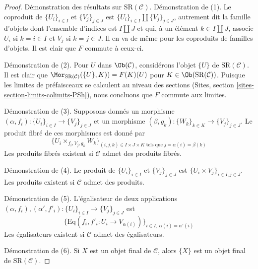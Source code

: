\begin{proof}
Démonstration des résultats sur $\text{SR}(\mathcal{C})$.
Démonstration de (1). Le coproduit de $\{U_i\}_{i \in I}$ et $\{V_j\}_{j \in J}$ est
$\{U_i\}_{i \in I} \amalg \{V_j\}_{j \in J}$, autrement dit la famille
d'objets dont l'ensemble d'indices est $I \amalg J$ et qui, à un élément
$k \in I \amalg J$, associe $U_i$ si $k = i \in I$ et $V_j$ si
$k = j \in J$. Il en va de même pour les coproduits
de familles d'objets. Il est clair que $F$ commute à ceux-ci.

\medskip\noindent
Démonstration de (2). Pour $U$ dans $\Ob(\mathcal{C})$, considérons l'objet $\{U\}$ de
$\text{SR}(\mathcal{C})$. Il est clair que
$\Mor_{\text{SR}(\mathcal{C})}(\{U\}, K)) = F(K)(U)$
pour $K \in \Ob(\text{SR}(\mathcal{C}))$. Puisque les limites de préfaisceaux
se calculent au niveau des sections
(Sites, section \ref{sites-section-limits-colimits-PSh}),
nous concluons que $F$ commute aux limites.

\medskip\noindent
Démonstration de (3). Supposons donnés un morphisme
$(\alpha, f_i) : \{U_i\}_{i \in I} \to \{V_j\}_{j \in J}$
et un morphisme
$(\beta, g_k) : \{W_k\}_{k \in K} \to \{V_j\}_{j \in J}$.
Le produit fibré de ces morphismes est donné par
$$
\{ U_i \times_{f_i, V_j, g_k} W_k\}_{(i, j, k) \in I \times J \times K
\text{ tels que } j = \alpha(i) = \beta(k)}
$$
Les produits fibrés existent si $\mathcal{C}$ admet des produits fibrés.

\medskip\noindent
Démonstration de (4). Le produit de $\{U_i\}_{i \in I}$ et $\{V_j\}_{j \in J}$ est
$\{U_i \times V_j\}_{i \in I, j \in J}$. Les produits existent si
$\mathcal{C}$ admet des produits.

\medskip\noindent
Démonstration de (5). L'égalisateur de deux applications
$(\alpha, f_i), (\alpha', f'_i) : \{U_i\}_{i \in I} \to \{V_j\}_{j \in J}$
est
$$
\{
\text{Eq}(f_i, f'_i : U_i \to V_{\alpha(i)})
\}_{i \in I,\ \alpha(i) = \alpha'(i)}
$$
Les égalisateurs existent si $\mathcal{C}$ admet des égalisateurs.

\medskip\noindent
Démonstration de (6). Si $X$ est un objet final de $\mathcal{C}$, alors
$\{X\}$ est un objet final de $\text{SR}(\mathcal{C})$.


\end{proof}
